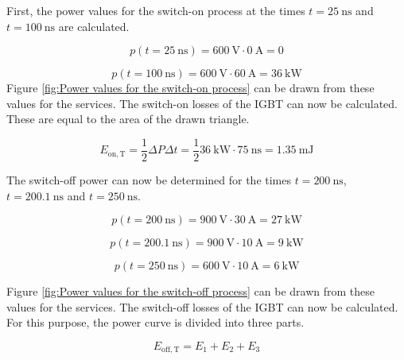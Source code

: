   \begin{solutionblock}
    First, the power values for the switch-on process at the times $t = \SI{25}{\ns}$ and $ t = \SI{100}{\ns}$ are calculated.

    \begin{equation}
        p(t = \SI{25}{\ns}) = \SI{600}{\volt} \cdot \SI{0}{\ampere} = 0
    \end{equation}

    \begin{equation}
        p(t = \SI{100}{\ns}) = \SI{600}{\volt} \cdot \SI{60}{\ampere} = \SI{36}{\kilo\watt} 
    \end{equation}
    Figure \ref{fig:Power values for the switch-on process} can be drawn from these values for the services.
    The switch-on losses of the IGBT can now be calculated. These are equal to the area of the drawn triangle.
         
   \begin{equation}
    E_{\mathrm{on,T}} = \frac{1}{2} \Delta P \Delta t = \frac{1}{2} \SI{36}{\kilo\watt} \cdot \SI{75}{\ns} = \SI {1.35}{\milli\joule}
   \end{equation}

   The switch-off power can now be determined for the times $t = \SI{200}{\ns}$, $t = \SI{200.1}{\ns}$ and $t = \SI{250}{\ns}$.
   
    \begin{equation}
        p(t = \SI{200}{\ns}) = \SI{900}{\volt} \cdot \SI{30}{\ampere} = \SI{27}{\kilo\watt} 
    \end{equation}

    \begin{equation}
        p(t = \SI{200.1}{\ns}) = \SI{900}{\volt} \cdot \SI{10}{\ampere} = \SI{9}{\kilo\watt} 
    \end{equation}

    \begin{equation}
        p(t = \SI{250}{\ns}) = \SI{600}{\volt} \cdot \SI{10}{\ampere} = \SI{6}{\kilo\watt} 
    \end{equation}

    Figure \ref{fig:Power values for the switch-off process} can be drawn from these values for the services.
    The switch-off losses of the IGBT can now be calculated. For this purpose, the power curve is divided into three parts.
         
   \begin{equation}
    E_{\mathrm{off,T}} = E_{\mathrm{1}} + E_{\mathrm{2}} + E_{\mathrm{3}}
   \end{equation}
   

\end{solutionblock}
